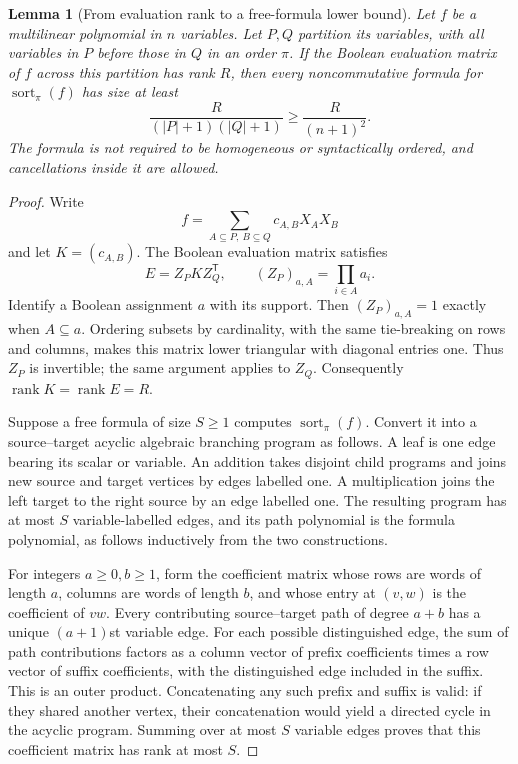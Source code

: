 \documentclass[11pt]{article}
\newtheorem{lemma}[theorem]{Lemma}
\theoremstyle{definition}
\theoremstyle{remark}
\begin{document}
\begin{lemma}[From evaluation rank to a free-formula lower bound]
\label{lem:evaluation-rank-free-formula}
Let $f$ be a multilinear polynomial in $n$ variables. Let $P,Q$
partition its variables, with all variables in $P$ before those in
$Q$ in an order $\pi$. If the Boolean evaluation matrix of $f$
across this partition has rank $R$, then every noncommutative
formula for $\operatorname{sort}_{\pi}(f)$ has size at least
\[
 \frac{R}{(|P|+1)(|Q|+1)}\ge\frac{R}{(n+1)^2}.
\]
The formula is not required to be homogeneous or syntactically
ordered, and cancellations inside it are allowed.
\end{lemma}
\begin{proof}
Write
\[
 f=\sum_{A\subseteq P,\ B\subseteq Q}c_{A,B}X_AX_B
\]
and let $K=(c_{A,B})$. The Boolean evaluation matrix satisfies
\[
 E=Z_PKZ_Q^{\mathsf T},\qquad
 (Z_P)_{a,A}=\prod_{i\in A}a_i.
\]
Identify a Boolean assignment $a$ with its support. Then
$(Z_P)_{a,A}=1$ exactly when $A\subseteq a$. Ordering subsets by
cardinality, with the same tie-breaking on rows and columns,
makes this matrix lower triangular with diagonal entries one.
Thus $Z_P$ is invertible; the same argument applies to $Z_Q$.
Consequently $\operatorname{rank}K=\operatorname{rank}E=R$.

Suppose a free formula of size $S\ge1$ computes
$\operatorname{sort}_{\pi}(f)$. Convert it into a source--target
acyclic algebraic branching program as follows. A leaf is one
edge bearing its scalar or variable. An addition takes disjoint
child programs and joins new source and target vertices by edges
labelled one. A multiplication joins the left target to the right
source by an edge labelled one. The resulting program has at most
$S$ variable-labelled edges, and its path polynomial is the formula
polynomial, as follows inductively from the two constructions.

For integers $a\ge0,b\ge1$, form the coefficient matrix whose rows
are words of length $a$, columns are words of length $b$, and whose
entry at $(v,w)$ is the coefficient of $vw$. Every contributing
source--target path of degree $a+b$ has a unique $(a+1)$st variable
edge. For each possible distinguished edge, the sum of path
contributions factors as a column vector of prefix coefficients
times a row vector of suffix coefficients, with the distinguished
edge included in the suffix. This is an outer product. Concatenating
any such prefix and suffix is valid: if they shared another vertex,
their concatenation would yield a directed cycle in the acyclic
program. Summing over at most $S$ variable edges proves that this
coefficient matrix has rank at most $S$.


\end{proof}
\end{document}
